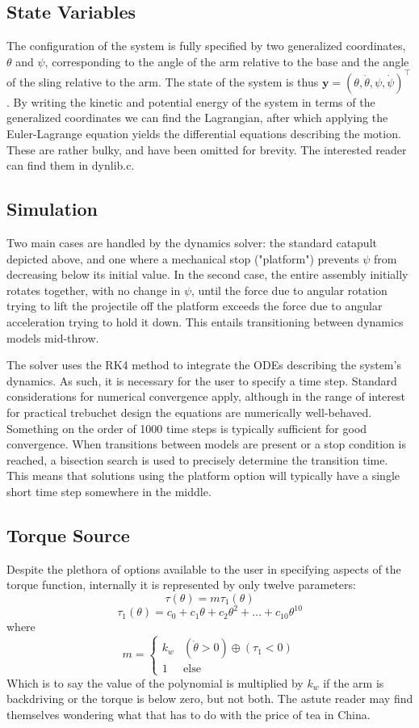 \documentclass{article}
\begin{document}
\subsection{State Variables}
The configuration of the system is fully specified by two generalized coordinates, $\theta$ and $\psi$, corresponding to the angle of the arm relative to the base and the angle of the sling relative to the arm. The state of the system is thus $\mathbf{y} = (\theta, \dot{\theta}, \psi, \dot{\psi})^\top$. By writing the kinetic and potential energy of the system in terms of the generalized coordinates we can find the Lagrangian, after which applying the Euler-Lagrange equation yields the differential equations describing the motion. These are rather bulky, and have been omitted for brevity. The interested reader can find them in dynlib.c.

\subsection{Simulation}
Two main cases are handled by the dynamics solver: the standard catapult depicted above, and one where a mechanical stop ("platform") prevents $\psi$ from decreasing below its initial value. In the second case, the entire assembly initially rotates together, with no change in $\psi$, until the force due to angular rotation trying to lift the projectile off the platform exceeds the force due to angular acceleration trying to hold it down. This entails transitioning between dynamics models mid-throw.\par

The solver uses the RK4 method to integrate the ODEs describing the system's dynamics. As such, it is necessary for the user to specify a time step. Standard considerations for numerical convergence apply, although in the range of interest for practical trebuchet design the equations are numerically well-behaved. Something on the order of 1000 time steps is typically sufficient for good convergence. When transitions between models are present or a stop condition is reached, a bisection search is used to precisely determine the transition time. This means that solutions using the platform option will typically have a single short time step somewhere in the middle. \par


\subsection{Torque Source}
Despite the plethora of options available to the user in specifying aspects of the torque function, internally it is represented by only twelve parameters:
\[\tau(\theta) = m\tau_1(\theta)\]
\[\tau_1(\theta) = c_0 + c_1\theta + c_2\theta^2 + \ldots + c_{10}\theta^{10}\]
where
\[m = \begin{cases} k_w &(\dot{\theta}>0)\oplus(\tau_1<0)\\
1 & \mbox{else } \end{cases}\]
Which is to say the value of the polynomial is multiplied by $k_w$ if the arm is backdriving or the torque is below zero, but not both. The astute reader may find themselves wondering what that has to do with the price of tea in China.
\end{document}

